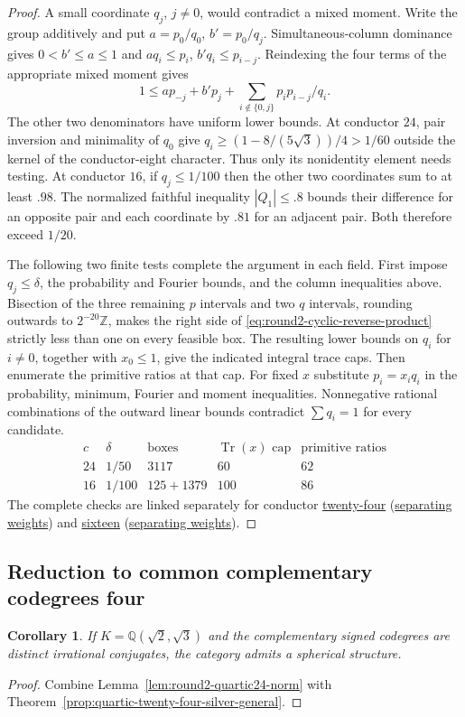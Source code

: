 \documentclass[11pt,reqno]{amsart}
\newcommand{\codecheck}[2]{\href{https://github.com/sebastienpalcoux/grothendieck-ring-classification/blob/d5750105bb5758f3ad38d2e5464dfcc12c019816/supplements/rank6/sphericality/#1}{#2}}
\newtheorem{corollary}[theorem]{Corollary}
\theoremstyle{remark}\newtheorem{remark}[theorem]{Remark}
\numberwithin{equation}{section}
\begin{document}
\begin{proof}
A small coordinate $q_j$, $j\ne0$, would contradict a mixed moment.
Write the group additively and put $a=p_0/q_0$, $b'=p_0/q_j$.
Simultaneous-column dominance gives $0<b'\le a\le1$ and
$a q_i\le p_i$, $b' q_i\le p_{i-j}$. Reindexing the four terms
of the appropriate mixed moment gives
\begin{equation}\label{eq:round2-cyclic-reverse-product}
  1\le a p_{-j}+b'p_j+
       \sum_{i\notin\{0,j\}}p_i p_{i-j}/q_i .
\end{equation}
The other two denominators have uniform lower bounds.
At conductor $24$, pair inversion and minimality of $q_0$ give
$q_i\ge(1-8/(5\sqrt3))/4>1/60$ outside the kernel of the
conductor-eight character. Thus only its nonidentity element needs
testing. At conductor $16$, if $q_j\le1/100$ then the other two
coordinates sum to at least $.98$. The normalized faithful inequality
$|Q_1|\le.8$ bounds their difference for an opposite pair and each
coordinate by $.81$ for an adjacent pair. Both therefore exceed $1/20$.

The following two finite tests complete the argument in each field.
First impose $q_j\le\delta$, the probability and Fourier bounds,
and the column inequalities above. Bisection of the three remaining
$p$ intervals and two $q$ intervals, rounding outwards to
$2^{-20}\mathbb Z$, makes the right side of
\eqref{eq:round2-cyclic-reverse-product} strictly less than one on
every feasible box. The resulting lower bounds on $q_i$ for $i\ne0$,
together with $x_0\le1$, give the indicated integral trace caps.
Then enumerate the primitive ratios at that cap. For fixed $x$
substitute $p_i=x_iq_i$ in the probability, minimum, Fourier and
moment inequalities. Nonnegative rational combinations of the
outward linear bounds contradict $\sum q_i=1$ for every candidate.
\[
\begin{array}{c|c|r|r|r}
 c&\delta&\text{boxes}&\operatorname{Tr}(x)\text{ cap}&
   \text{primitive ratios}\\\hline
 24&1/50&3117&60&62\\
 16&1/100&125+1379&100&86
\end{array}
\]
The complete checks are linked separately for conductor
\codecheck{quartic24_nonhalf_height.py}{twenty-four}
(\codecheck{quartic24_nonhalf_check.py}{separating weights}) and
\codecheck{field_checks/sixteen/nonhalf_height.py}{sixteen}
(\codecheck{field_checks/sixteen/nonhalf_verify.py}{separating weights}).
\end{proof}

\subsection{Reduction to common complementary codegrees four}
\begin{corollary}\label{cor:round2-quartic24-irrational}
If $K=\mathbb Q(\sqrt2,\sqrt3)$ and the complementary signed codegrees are distinct irrational conjugates, the category admits a spherical structure.
\end{corollary}
\begin{proof}
Combine Lemma~\ref{lem:round2-quartic24-norm} with Theorem~\ref{prop:quartic-twenty-four-silver-general}.
\end{proof}
\end{document}
